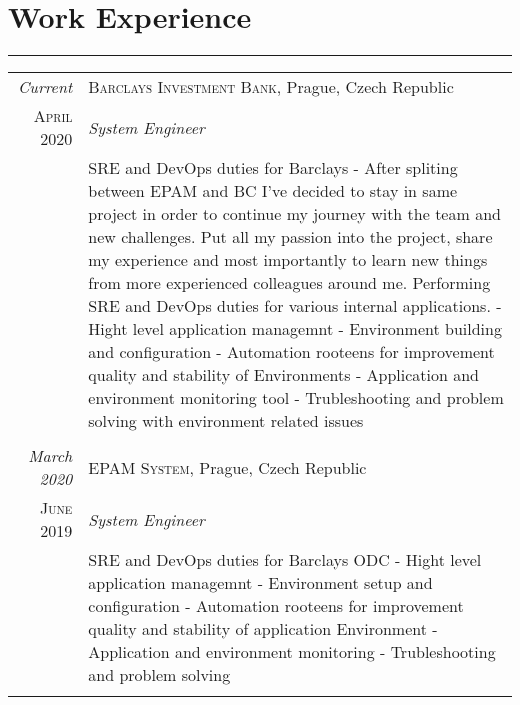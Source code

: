 \documentclass[a4paper,10pt]{article}
\begin{document}
\section*{Work Experience}
\vspace{-0.5ex}%
\rule{\textwidth}{0.3pt}
\vspace{-0.5ex}%
\begin{longtable}{r|p{11cm}}
\emph{Current} & \textsc{Barclays Investment Bank}, Prague, Czech Republic\\
\textsc{April 2020} & \emph{System Engineer}\\ 
& \footnotesize{\textnormal{SRE and DevOps duties for Barclays\newline
- After spliting between EPAM and BC I’ve decided to stay in same project in order to
continue my journey with the team and new challenges. Put all my passion into the project,
share my experience and most importantly to learn new things from more experienced
colleagues around me. Performing SRE and DevOps duties for various internal applications.
- Hight level application managemnt\newline
- Environment building and configuration\newline
- Automation rooteens for improvement quality and stability of Environments\newline
- Application and environment monitoring tool\newline
- Trubleshooting and problem solving with environment related issues}}\\
\multicolumn{2}{c}{} \\
  \emph{March 2020} & \textsc{EPAM System}, Prague, Czech Republic \\
\textsc{June 2019} & \emph{System Engineer}\\ 
& \footnotesize{\textnormal{SRE and DevOps duties for Barclays ODC\newline
- Hight level application managemnt\newline
- Environment setup and configuration\newline
- Automation rooteens for improvement quality and stability of application Environment\newline
- Application and environment monitoring\newline
- Trubleshooting and problem solving}}\\
\multicolumn{2}{c}{} \\

\end{longtable}
\end{document}
